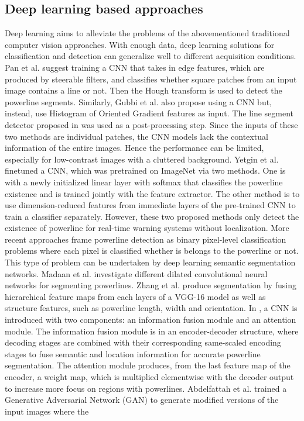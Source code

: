 \documentclass[journal]{IEEEtran}
\begin{document}
\subsection{Deep learning based approaches}
Deep learning aims to alleviate the problems of the abovementioned traditional computer vision approaches. With enough data, deep learning solutions for classification and detection can generalize well to different acquisition conditions. Pan et al. \cite{related_work_chaofeng_pan_2016} suggest training a CNN that takes in edge features, which are produced by steerable filters, and classifies whether square patches from an input image contains a line or not. Then the Hough transform is used to detect the powerline segments. Similarly, Gubbi et al. \cite{related_work_jayavardhana_gubbi} also propose using a CNN but, instead, use Histogram of Oriented Gradient features as input. The line segment detector proposed in \cite{lsd} was used as a post-processing step. Since the inputs of these two methods are individual patches, the CNN models lack the contextual information of the entire images. Hence the performance can be limited, especially for low-contrast images with a cluttered background. Yetgin et al. \cite{related_work_omer_emre_yetgin_2018} finetuned a CNN, which was pretrained on ImageNet \cite{deng2009imagenet} via two methods. One is with a newly initialized linear layer with softmax that classifies the powerline existence and is trained jointly with the feature extractor. The other method is to use dimension-reduced features from immediate layers of the pre-trained CNN to train a classifier separately. However, these two proposed methods only detect the existence of powerline for real-time warning systems without localization. More recent approaches \cite{related_work_rainesh_mandaan_2017,related_work_heng_zhang_2019,related_work_yan_li_2019,related_work_rabab_abdelfattah_2022,related_work_rabeea_haffari_2021} frame powerline detection as binary pixel-level classification problems where each pixel is classified whether is belongs to the powerline or not. This type of problem can be undertaken by deep learning semantic segmentation networks. Madaan et al. \cite{related_work_rainesh_mandaan_2017} investigate different dilated convolutional neural networks for segmenting powerlines. Zhang et al. \cite{related_work_heng_zhang_2019} produce segmentation by fusing hierarchical feature maps from each layers of a VGG-16 model \cite{vgg} as well as structure features, such as powerline length, width and orientation. In \cite{related_work_yan_li_2019}, a CNN is introduced with two components: an information fusion module and an attention module. The information fusion module is in an encoder-decoder structure, where decoding stages are combined with their corresponding same-scaled encoding stages to fuse semantic and location information for accurate powerline segmentation. The attention module produces, from the last feature map of the encoder, a weight map, which is multiplied elementwise with the decoder output to increase more focus on regions with powerlines. Abdelfattah et al. \cite{related_work_rabab_abdelfattah_2022} trained a Generative Adversarial Network (GAN) to generate modified versions of the input images where the 
\end{document}
